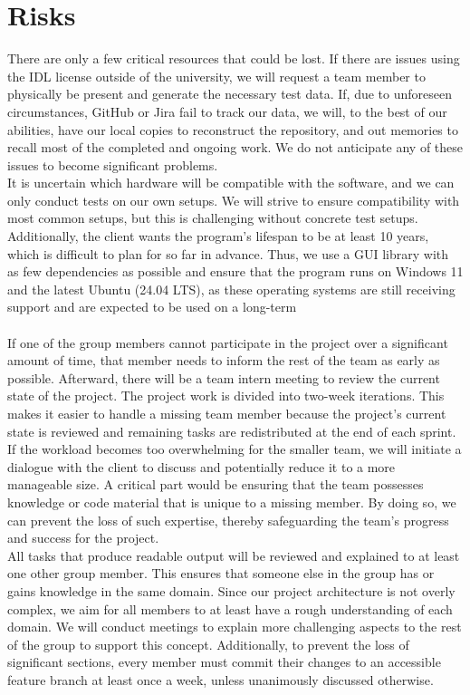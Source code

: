 \documentclass[
	points=true,
 	nenglish,
	colorbacktitle,
	identbarcolor=2b,
	accentcolor=2b
	]{tudaexercise}
\begin{document}
\section{Risks}
There are only a few critical resources that could be lost. If there are issues using the IDL license outside of the university, we will request a team member to physically be present and generate the necessary test data. If, due to unforeseen circumstances, GitHub or Jira fail to track our data, we will, to the best of our abilities, have our local copies to reconstruct the repository, and out memories to recall most of the completed and ongoing work. We do not anticipate any of these issues to become significant problems. \\
It is uncertain which hardware will be compatible with the software, and we can only conduct tests on our own setups. We will strive to ensure compatibility with most common setups, but this is challenging without concrete test setups. Additionally, the client wants the program's lifespan to be at least 10 years, which is difficult to plan for so far in advance. Thus, we use a GUI library with as few dependencies as possible and ensure that the program runs on Windows 11 and the latest Ubuntu (24.04 LTS), as these operating systems are still receiving support and are expected to be used on a long-term \\ \\
If one of the group members cannot participate in the project over a significant amount of time, that member needs to inform the rest of the team as early as possible. Afterward, there will be a team intern meeting to review the current state of the project. The project work is divided into two-week iterations. This makes it easier to handle a missing team member because the project's current state is reviewed and remaining tasks are redistributed at the end of each sprint. \\
If the workload becomes too overwhelming for the smaller team, we will initiate a dialogue with the client to discuss and potentially reduce it to a more manageable size. A critical part would be ensuring that the team possesses knowledge or code material that is unique to a missing member. By doing so, we can prevent the loss of such expertise, thereby safeguarding the team's progress and success for the project. \\
All tasks that produce readable output will be reviewed and explained to at least one other group member. This ensures that someone else in the group has or gains knowledge in the same domain. Since our project architecture is not overly complex, we aim for all members to at least have a rough understanding of each domain. We will conduct meetings to explain more challenging aspects to the rest of the group to support this concept. Additionally, to prevent the loss of significant sections, every member must commit their changes to an accessible feature branch at least once a week, unless unanimously discussed otherwise. \\ \\
\end{document}
